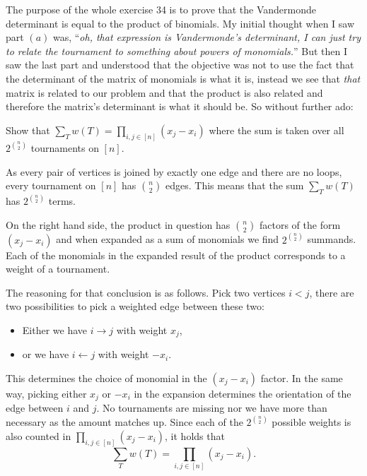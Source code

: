 \documentclass[12pt]{memoir}
\begin{document}
The purpose of the whole exercise 34 is to prove that the Vandermonde determinant is equal to the product of binomials. My initial thought when I saw part $(a)$ was, ``\emph{oh, that expression is Vandermonde's determinant, I can just try to relate the tournament to something about powers of monomials.}'' But then I saw the last part and understood that the objective was not to use the fact that the determinant of the matrix of monomials is what it is, instead we see that \emph{that} matrix is related to our problem and that the product is also related and therefore the matrix's determinant is what it should be. So without further ado:

\begin{Ej}
    Show that $\sum_Tw(T)=\prod_{i,j\in[n]}(x_j-x_i)$
    where the sum is taken over all $2^{\binom{n}{2}}$ tournaments on $[n]$.
 \end{Ej}

\begin{ptcbr}
As every pair of vertices is joined by exactly one edge and there are no loops, every tournament on $[n]$ has $\binom{n}{2}$ edges. This means that the sum $\sum_Tw(T)$ has $2^{\binom{n}{2}}$ terms.\par 
On the right hand side, the product in question has $\binom{n}{2}$ factors of the form $(x_j-x_i)$ and when expanded as a sum of monomials we find $2^{\binom{n}{2}}$ summands. Each of the monomials in the expanded result of the product corresponds to a weight of a tournament.\par 
The reasoning for that conclusion is as follows. Pick two vertices $i<j$, there are two possibilities to pick a weighted edge between these two:
\vspace*{-0.4em}
\begin{itemize}
    \itemsep=-0.4em
    \item Either we have $i\to j$ with weight $x_j$, 
    \item or we have $i\leftarrow j$ with weight $-x_i$.
\end{itemize}
This determines the choice of monomial in the $(x_j-x_i)$ factor. In the same way, picking either $x_j$ or $-x_i$ in the expansion determines the orientation of the edge between $i$ and $j$. No tournaments are missing nor we have more than necessary as the amount matches up. Since each of the $2^{\binom{n}{2}}$ possible weights is also counted in $\prod_{i,j\in[n]}(x_j-x_i)$, it holds that 
$$\sum_Tw(T)=\prod_{i,j\in[n]}(x_j-x_i).$$
\end{ptcbr}
\end{document}
